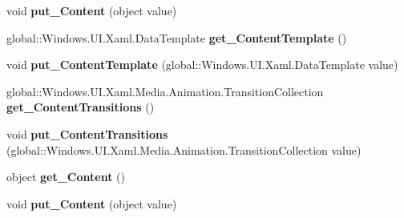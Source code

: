 \begin{DoxyCompactItemize}
\mbox{\label{interface_windows_1_1_u_i_1_1_xaml_1_1_controls_1_1_i_content_control_a5350840458a62ceb693e7746c04986f3}} 
void {\bfseries put\+\_\+\+Content} (object value)
\item 
\mbox{\label{interface_windows_1_1_u_i_1_1_xaml_1_1_controls_1_1_i_content_control_aa941dee35deb2872cc78a0e3bbfaa7f6}} 
global\+::\+Windows.\+U\+I.\+Xaml.\+Data\+Template {\bfseries get\+\_\+\+Content\+Template} ()
\item 
\mbox{\label{interface_windows_1_1_u_i_1_1_xaml_1_1_controls_1_1_i_content_control_ab8635fb05ae89dd2ff4d0697e5c78b84}} 
void {\bfseries put\+\_\+\+Content\+Template} (global\+::\+Windows.\+U\+I.\+Xaml.\+Data\+Template value)
\item 
\mbox{\label{interface_windows_1_1_u_i_1_1_xaml_1_1_controls_1_1_i_content_control_aa51222b3d15db7740854e4ddbad68fd3}} 
global\+::\+Windows.\+U\+I.\+Xaml.\+Media.\+Animation.\+Transition\+Collection {\bfseries get\+\_\+\+Content\+Transitions} ()
\item 
\mbox{\label{interface_windows_1_1_u_i_1_1_xaml_1_1_controls_1_1_i_content_control_a1c0aac2a725d08d1f7e467ea2dd8afd3}} 
void {\bfseries put\+\_\+\+Content\+Transitions} (global\+::\+Windows.\+U\+I.\+Xaml.\+Media.\+Animation.\+Transition\+Collection value)
\item 
\mbox{\label{interface_windows_1_1_u_i_1_1_xaml_1_1_controls_1_1_i_content_control_ab27572e586326eb57ff5e937f9ed7318}} 
object {\bfseries get\+\_\+\+Content} ()
\item 
\mbox{\label{interface_windows_1_1_u_i_1_1_xaml_1_1_controls_1_1_i_content_control_a5350840458a62ceb693e7746c04986f3}} 
void {\bfseries put\+\_\+\+Content} (object value)
\item 
\mbox{\label{interface_windows_1_1_u_i_1_1_xaml_1_1_controls_1_1_i_content_control_aa941dee35deb2872cc78a0e3bbfaa7f6}} 

\end{DoxyCompactItemize}

